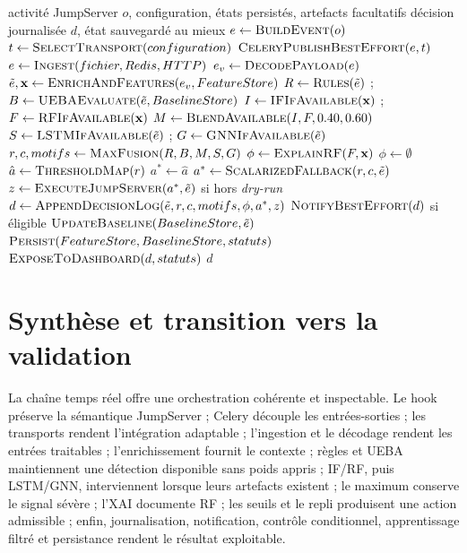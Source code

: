 \documentclass[11pt,a4paper,oneside]{report}
\theoremstyle{definition}
\theoremstyle{plain}
\begin{document}
\begin{algorithm}[H]
\caption{Traitement en ligne global d'un événement CyberVault}
\label{alg:method-online}
\begin{algorithmic}[1]
\Require activité JumpServer \(o\), configuration, états persistés, artefacts facultatifs
\Ensure décision journalisée \(d\), état sauvegardé au mieux
\State \(e\leftarrow\Call{BuildEvent}{o}\)
\State \(t\leftarrow\Call{SelectTransport}{configuration}\)
\State \(\Call{CeleryPublishBestEffort}{e,t}\)
\State \(e\leftarrow\Call{Ingest}{fichier,Redis,HTTP}\) 
\State \(e_v\leftarrow\Call{DecodePayload}{e}\) 
\State \(\tilde e,\mathbf{x}\leftarrow\Call{EnrichAndFeatures}{e_v,FeatureStore}\)
\State \(R\leftarrow\Call{Rules}{\tilde e}\) ; \(B\leftarrow\Call{UEBAEvaluate}{\tilde e,BaselineStore}\)
\State \(I\leftarrow\Call{IFIfAvailable}{\mathbf{x}}\) ; \(F\leftarrow\Call{RFIfAvailable}{\mathbf{x}}\)
\State \(M\leftarrow\Call{BlendAvailable}{I,F,0.40,0.60}\) 
\State \(S\leftarrow\Call{LSTMIfAvailable}{\tilde e}\) ; \(G\leftarrow\Call{GNNIfAvailable}{\tilde e}\)
\State \(r,c,motifs\leftarrow\Call{MaxFusion}{R,B,M,S,G}\)
  \State \(\phi\leftarrow\Call{ExplainRF}{F,\mathbf{x}}\)
\Else
  \State \(\phi\leftarrow\emptyset\)
\EndIf
\State \(\hat a\leftarrow\Call{ThresholdMap}{r}\)
  \State \(a^*\leftarrow\hat a\)
\Else
  \State \(a^*\leftarrow\Call{ScalarizedFallback}{r,c,\tilde e}\)
\EndIf
\State \(z\leftarrow\Call{ExecuteJumpServer}{a^*,\tilde e}\) si hors \emph{dry-run}
\State \(d\leftarrow\Call{AppendDecisionLog}{\tilde e,r,c,motifs,\phi,a^*,z}\)
\State \(\Call{NotifyBestEffort}{d}\) si éligible
  \State \(\Call{UpdateBaseline}{BaselineStore,\tilde e}\)
\EndIf
\State \(\Call{Persist}{FeatureStore,BaselineStore,statuts}\)
\State \(\Call{ExposeToDashboard}{d,statuts}\) 
\State \Return \(d\)
\end{algorithmic}
\end{algorithm}

\section{Synthèse et transition vers la validation}

La chaîne temps réel offre une orchestration cohérente et inspectable. Le hook
préserve la sémantique JumpServer ; Celery découple les entrées-sorties ; les
transports rendent l'intégration adaptable ; l'ingestion et le décodage
rendent les entrées traitables ; l'enrichissement fournit le contexte ; règles
et UEBA maintiennent une détection disponible sans poids appris ; IF/RF, puis
LSTM/GNN, interviennent lorsque leurs artefacts existent ; le maximum conserve
le signal sévère ; l'XAI documente RF ; les seuils et le repli produisent une
action admissible ; enfin, journalisation, notification, contrôle conditionnel,
apprentissage filtré et persistance rendent le résultat exploitable.
\end{document}
